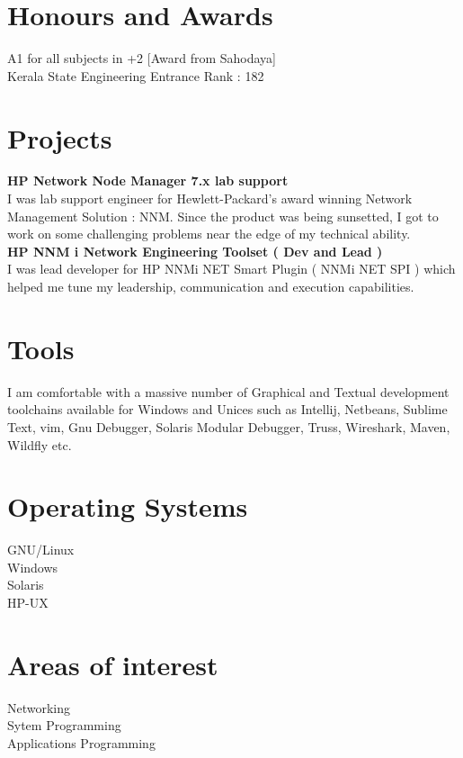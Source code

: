 \documentclass[line,margin]{res}
\begin{document}
\begin{resume}
\section{Honours and Awards}
A1 for all subjects in +2  [Award from Sahodaya]\\
Kerala State Engineering Entrance Rank : 182\\

\section{Projects}
{\bf HP Network Node Manager 7.x lab support}\\
I was lab support engineer for Hewlett-Packard's award winning Network Management Solution : NNM. Since the product was being sunsetted, I got to work on some challenging problems near the edge of my technical ability.\\

{\bf HP NNM i Network Engineering Toolset ( Dev and Lead )}\\
I was lead developer for HP NNMi NET Smart Plugin ( NNMi NET SPI ) which helped me tune my leadership, communication and execution capabilities.\\

\section{Tools}
I am comfortable with a massive number of Graphical and Textual development toolchains available for Windows and Unices such as Intellij, Netbeans, Sublime Text, vim, Gnu Debugger, Solaris Modular Debugger, Truss, Wireshark, Maven, Wildfly etc.\\

\section{Operating Systems}
GNU/Linux\\
Windows\\
Solaris\\
HP-UX\\

\section{Areas of interest}
Networking\\
Sytem Programming\\
Applications Programming\\


\end{resume}
\end{document}
